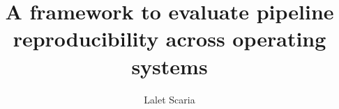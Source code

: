 \author{Lalet Scaria}
\title{A framework to evaluate pipeline reproducibility across operating systems}

